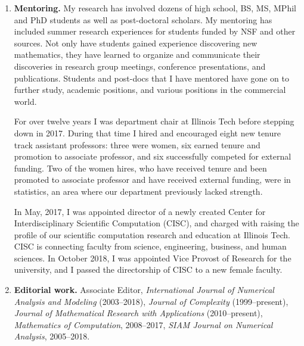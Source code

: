 \documentclass[11 pt]{NSFamsart}
\begin{document}
\medskip


\begin{enumerate} \renewcommand{\labelenumi}{[\arabic{enumi}]}
	   
		\item \textbf{Mentoring.} My research has involved dozens of high school, BS, MS, MPhil and PhD students as 
		well as post-doctoral scholars.  My mentoring has included summer research experiences for 
		students funded by NSF and other sources.  Not only have 
		students gained experience discovering new mathematics, they have learned to 
		organize and communicate their discoveries in research group meetings, conference 
		presentations, and publications.  Students and post-docs that I have mentored have gone on to 
		further study, academic positions, and various positions in the commercial world.
		
		For over twelve years I was department chair at Illinois Tech before stepping down in 
		2017.  During that time I hired and encouraged eight new tenure track assistant professors: 
		three were women, six earned tenure and promotion to associate professor, and six 
		successfully 
		competed for external funding.  Two of the women hires, who have received tenure and been 
		promoted to associate professor and have received external funding, were in statistics, an area 
		where our department previously lacked strength.   
		
		In May, 2017, I was appointed director of a 
		newly 
		created Center for Interdisciplinary Scientific 
		Computation (CISC), and charged with raising the profile of our scientific computation research 
		and 
		education at Illinois Tech. CISC is connecting faculty from science, engineering, business, and 
		human sciences. 	In October 2018, I was appointed Vice Provost of Research for the university, and I passed the directorship of CISC to a new female faculty.

	    \item \textbf{Editorial work.} Associate Editor, {\em International Journal of Numerical Analysis and Modeling} 
	    (2003--2018), {\em Journal of Complexity} (1999--present), {\em Journal of Mathematical 
	    Research with Applications} (2010--present),
		{\em Mathematics of Computation}, 2008--2017, {\em SIAM Journal on Numerical Analysis}, 
		2005--2018.
		
	

\end{enumerate}
\end{document}
